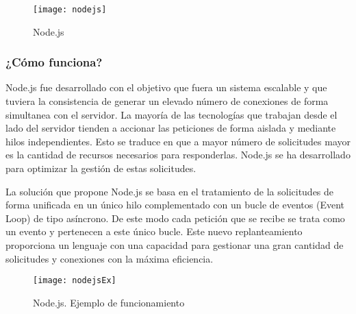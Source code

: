\begin{figure}[h]
	\centering
	\texttt{[image: nodejs]}
	\caption{Node.js}
	\label{fig:nodejs}
\end{figure}

\subsubsection{¿Cómo funciona?}

Node.js fue desarrollado con el objetivo que fuera un sistema escalable y que tuviera la consistencia de generar un elevado número de conexiones de forma simultanea con el servidor. La mayoría de las tecnologías que trabajan desde el lado del servidor tienden a accionar las peticiones de forma aislada y mediante hilos independientes. Esto se traduce en que a mayor número de solicitudes mayor es la cantidad de recursos necesarios para responderlas. Node.js se ha desarrollado para optimizar la gestión de estas solicitudes.

La solución que propone Node.js se basa en el tratamiento de la solicitudes de forma unificada en un único hilo complementado con un bucle de eventos (Event Loop\cite{URL::EventLoop}) de tipo asíncrono. De este modo cada petición que se recibe se trata como un evento y pertenecen a este único bucle. Este nuevo replanteamiento proporciona un lenguaje con una capacidad para gestionar una gran cantidad de solicitudes y conexiones con la máxima eficiencia.


\begin{figure}[h]
	\centering
	\texttt{[image: nodejsEx]}
	\caption{Node.js. Ejemplo de funcionamiento}
	\label{fig:nodejsEx}
\end{figure}



